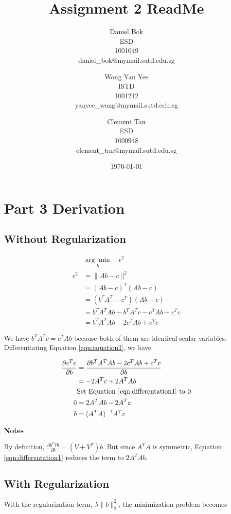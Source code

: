 \documentclass[]{article}
\title{Assignment 2 ReadMe}
\author{
	Daniel Bok \\
	ESD \\
	1001049 \\
	daniel\_bok@mymail.sutd.edu.sg 
	\and
	Wong Yan Yee\\ 
	ISTD \\
	1001212 \\
	yanyee\_wong@mymail.sutd.edu.sg
	\and
	Clement Tan \\
	ESD \\
	1000948 \\
	clement\_tan@mymail.sutd.edu.sg
}
\date{\today}
\begin{document}
	
\maketitle
	
\section{Part 3 Derivation}

\subsection{Without Regularization}

\begin{align}
&\underset{b}{\arg\min} \quad \epsilon^2 \nonumber \\
\epsilon^2 &= \| Ab - c \|^2 \nonumber \\
&= (Ab - c)^T(Ab - c) \nonumber \\
&= (b^TA^T - c^T)(Ab - c) \nonumber \\
&= b^TA^TAb - b^TA^Tc - c^TAb + c^Tc \nonumber \\
&= b^TA^TAb - 2c^TAb + c^Tc \label{eqn:equation1}
\end{align}

We have  $b^TA^Tc = c^TAb$ because both of them are identical scalar variables. Differentiating Equation \ref{eqn:equation1}, we have

\begin{align}
\frac{\partial \epsilon^T\epsilon}{\partial b} 
	&= \frac{\partial b^TA^TAb - 2c^TAb + c^Tc}{\partial b} \nonumber \\
&= -2A^Tc + 2A^TAb \label{eqn:differentation1}\\
&\text{Set Equation \ref{eqn:differentation1} to 0} \nonumber \\ 
0 &= 2A^TAb - 2A^Tc \nonumber \\
b &= (A^TA)^{-1}A^Tc
\end{align}

\textbf{Notes}

By definition, $\frac{\partial b^TVb}{\partial b} = (V + V^T)b$. But since $A^TA$ is symmetric, Equation \ref{eqn:differentation1} reduces the term to $2A^TAb$.

\subsection{With Regularization}

With the regularization term, $\lambda\|b\|^2_2$, the minimization problem becomes
\end{document}

